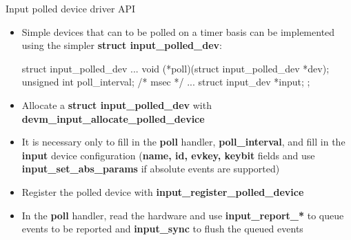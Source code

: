 \begin{frame}
	{Input polled device driver API}
	\begin{itemize}
		\item
			Simple devices that can to be polled on a timer basis can be implemented using the simpler \textbf{struct input\_polled\_dev}:
			\begin{rawfootnotesize}
struct input_polled_dev {
	...
	void (*poll)(struct input_polled_dev *dev);
	unsigned int poll_interval; /* msec */
	...
	struct input_dev *input;
};
			\end{rawfootnotesize}
		\item
			Allocate a \textbf{struct input\_polled\_dev} with \textbf{devm\_input\_allocate\_polled\_device}
		\item
			It is necessary only to fill in the \textbf{poll} handler, \textbf{poll\_interval}, and fill in the \textbf{input} device configuration (\textbf{name, id, evkey, keybit} fields and use \textbf{input\_set\_abs\_params} if absolute events are supported)
		\item
			Register the polled device with \textbf{input\_register\_polled\_device}
		\item
			In the \textbf{poll} handler, read the hardware and use \textbf{input\_report\_*} to queue events to be reported and \textbf{input\_sync} to flush the queued events
	\end{itemize}
\end{frame}
